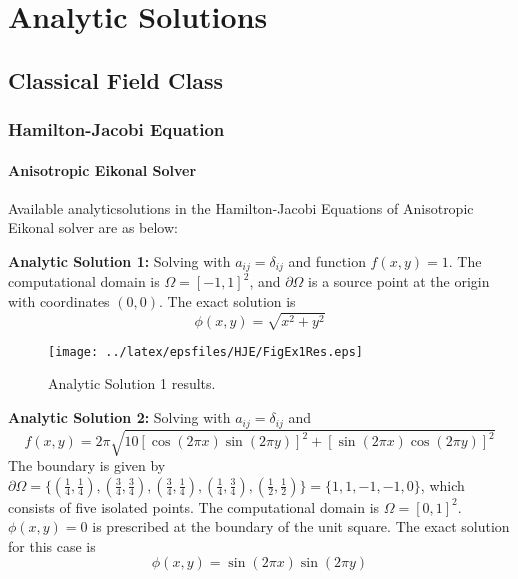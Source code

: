 \clearemptydoublepage
\chapter{Analytic Solutions}
\label{cha:analyticsolutions}


\section{Classical Field Class}
\clearpage
%
\clearpage
%
\clearpage
%
\clearpage
%
\clearpage

\clearpage

\subsection{Hamilton-Jacobi Equation}

\subsubsection{Anisotropic Eikonal Solver}

Available analyticsolutions in the Hamilton-Jacobi Equations of Anisotropic Eikonal solver are as below:


\textbf{Analytic Solution 1:} Solving with $a_{ij}=\delta_{ij}$ and function $f(x,y)=1$. The computational domain is $\Omega=[-1,1]^2$, and $\partial\Omega$ is a source point at the origin with coordinates $(0,0)$. The exact solution is $$\phi(x,y)=\sqrt{x^2+y^2}$$

\begin{figure}[h]
  \centering
    \texttt{[image: ../latex/epsfiles/HJE/FigEx1Res.eps]}
  \caption{Analytic Solution 1 results.}
  \label{fig:Ex1}
\end{figure}


\textbf{Analytic Solution 2:} Solving with $a_{ij}=\delta_{ij}$ and $$f(x,y)=2\pi \sqrt{10[\cos{(2\pi x)}\sin{(2\pi y)}]^2+[\sin{(2\pi x)}\cos{(2\pi y)}]^2}$$ The boundary is given by $\partial\Omega=\{(\frac{1}{4},\frac{1}{4}),(\frac{3}{4},\frac{3}{4}),(\frac{3}{4},\frac{1}{4}),(\frac{1}{4},\frac{3}{4}),(\frac{1}{2},\frac{1}{2})\}=\{1,1,-1,-1,0\}$, which consists of five isolated points. The computational domain is $\Omega=[0,1]^2$. $\phi(x,y)=0$ is prescribed at the boundary of the unit square. The exact solution for this case is $$\phi(x,y)=\sin{(2\pi x)} \sin{(2\pi y)}$$

